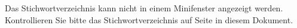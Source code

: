 
Das Stichwortverzeichnis kann nicht in einem Minifenster angezeigt werden. Kontrollieren Sie bitte das Stichwortverzeichnis auf Seite \pageref{index} in diesem Dokument.
